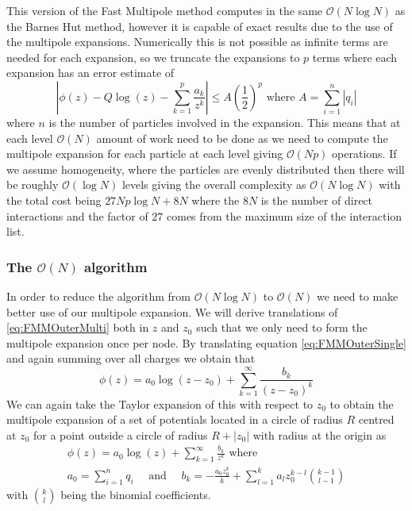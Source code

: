 This version of the Fast Multipole method computes in the same $\mathcal{O}(N\log N)$ as the Barnes Hut method, however it is capable of exact results due to the use of the multipole expansions. Numerically this is not possible as infinite terms are needed for each expansion, so we truncate the expansions to $p$ terms where each expansion has an error estimate of \cite{Beatson,Greengard1987ASimulations}
\begin{equation*}
    \left|\phi(z)-Q \log (z)-\sum_{k=1}^{p} \frac{a_{k}}{z^{k}}\right| \leq A\left(\frac{1}{2}\right)^{p} \text{ where } A = \sum_{i=1}^{n} |q_i|
\end{equation*}
where $n$ is the number of particles involved in the expansion. This means that at each level $\mathcal{O}(N)$ amount of work need to be done as we need to compute the multipole expansion for each particle at each level giving $\mathcal{O}(Np)$ operations. If we assume homogeneity, where the particles are evenly distributed then there will be roughly $\mathcal{O}(\log N)$ levels giving the overall complexity as $\mathcal{O}(N\log N)$ with the total cost being $27Np\log N + 8N$ where the $8N$ is the number of direct interactions and the factor of $27$ comes from the maximum size of the interaction list. 

\subsubsection{\texorpdfstring{The $\mathcal{O}(N)$ algorithm}{The O(N) algorithm}}
In order to reduce the algorithm from $\mathcal{O}(N\log N)$ to $\mathcal{O}(N)$ we need to make better use of our multipole expansion. We will derive translations of \cref{eq:FMMOuterMulti} both in $z$ and $z_0$ such that we only need to form the multipole expansion once per node.
By translating equation \cref{eq:FMMOuterSingle} and again summing over all charges we obtain that
\begin{equation}
\label{eq:FMMOuterMultiTrans1}
    \phi(z) = a_0\log(z-z_0) + \sum_{k=1}^\infty \frac{b_k}{(z-z_0)^k}
\end{equation}
We can again take the Taylor expansion of this with respect to $z_0$ to obtain the multipole expansion of a set of potentials located in a circle of radius $R$ centred at $z_0$ for a point outside a circle of radius $R+|z_0|$ with radius at the origin as 
\begin{equation}
\label{eq:FMMOuterMultiTrans2}
\begin{gathered}
    \phi(z) = a_0\log(z) + \sum_{k=1}^\infty \frac{b_k}{z^k} \text{ where } \\
    a_0 = \sum_{i=1}^n q_i \quad \text{ and } \quad b_k = -\frac{a_0 z_0^k}{k} + \sum_{l=1}^{k} a_l z_0^{k-l} \binom{k-1}{l-1}
\end{gathered}
\end{equation}
with $\binom{k}{l}$ being the binomial coefficients.

